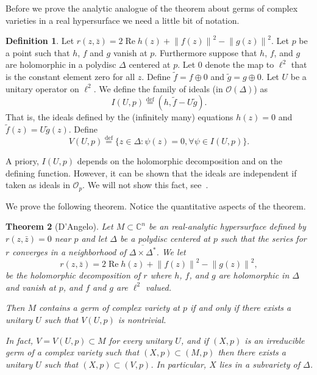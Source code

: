 \documentclass[12pt,openany]{book}
\renewcommand{\Re}{\operatorname{Re}}
\newcommand{\norm}[1]{\left\lVert {#1} \right\rVert}
\newcommand{\C}{{\mathbb{C}}}
\newcommand{\sO}{{\mathcal{O}}}
\theoremstyle{plain}
\newtheorem{thm}{Theorem}[section]
\theoremstyle{remark}
\theoremstyle{definition}
\newtheorem{defn}[thm]{Definition}
\theoremstyle{exercise}
\theoremstyle{example}
\begin{document}
Before we prove the analytic analogue of the theorem about germs of complex
varieties in a real hypersurface we need a little bit of notation.

\begin{defn} \label{idealsUdef}
Let $r(z,\bar{z}) = 2 \Re h(z) + \norm{f(z)}^2 - \norm{g(z)}^2$.  Let $p$
be a point such that $h$, $f$ and $g$ vanish at $p$.  Furthermore
suppose that $h$, $f$, and $g$ are holomorphic in a polydisc $\Delta$
centered at $p$.  Let $0$ denote the map to $\ell^2$ that is the constant
element zero for all $z$.  Define $\tilde{f} = f \oplus 0$ and
$\tilde{g} = g \oplus 0$.  Let $U$ be a unitary operator on $\ell^2$.
We define the family of ideals (in $\sO(\Delta)$) as
\begin{equation}
I(U,p) \overset{\mathrm{def}}{=} (h,\tilde{f} - U \tilde{g}) .
\end{equation}
That is, the ideals defined by the (infinitely many) equations $h(z) = 0$ and
$\tilde{f}(z) = U \tilde{g}(z)$.
Define
\begin{equation}
V(U,p) \overset{\mathrm{def}}{=} \{ z \in \Delta : \psi(z) = 0, \forall \psi
\in I(U,p) \} .
\end{equation}
\end{defn}

A priory, $I(U,p)$ depends on the holomorphic decomposition and on the
defining function.  However, it can be shown that the ideals are independent
if taken as ideals in $\sO_p$.
We will not show this fact, see~\cite{DAngelo}.

We prove the following theorem.
Notice the quantitative aspects of the theorem.

\begin{thm}[D'Angelo] \label{thm:holinm}
Let $M \subset \C^n$ be an real-analytic hypersurface defined by
$r(z,\bar{z}) = 0$ near $p$ and let $\Delta$ be a polydisc centered at $p$
such that the series for $r$ converges in a neighborhood of
$\overline{\Delta \times \Delta^*}$.  We let
\begin{equation}
r(z,\bar{z}) = 2 \Re h(z) + \norm{f(z)}^2-\norm{g(z)}^2 ,
\end{equation}
be the holomorphic decomposition of $r$
where $h$, $f$, and $g$ are holomorphic in $\Delta$ and vanish at $p$, and $f$
and $g$ are $\ell^2$ valued.

Then $M$ contains a germ of complex
variety at $p$ if and only if there exists a unitary $U$
such that $V(U,p)$ is nontrivial.

In fact, $V=V(U,p) \subset M$ for every unitary $U$, and if $(X,p)$
is an irreducible germ of a complex variety such that $(X,p) \subset (M,p)$
then there exists a unitary $U$ such that $(X,p) \subset (V,p)$.
In particular, $X$ lies in a subvariety of $\Delta$.
\end{thm}
\end{document}
